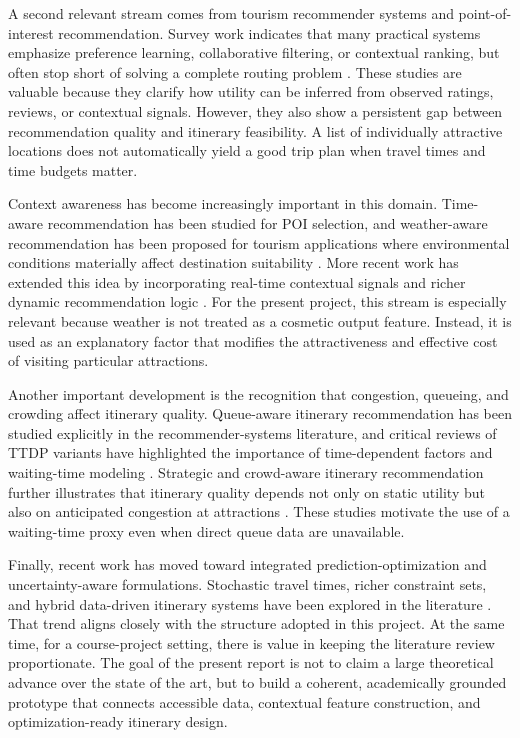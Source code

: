 \documentclass[12pt,a4paper]{article}
\begin{document}
A second relevant stream comes from tourism recommender systems and point-of-interest recommendation. Survey work indicates that many practical systems emphasize preference learning, collaborative filtering, or contextual ranking, but often stop short of solving a complete routing problem \citep{borras2014tourismsurvey, halder2024survey}. These studies are valuable because they clarify how utility can be inferred from observed ratings, reviews, or contextual signals. However, they also show a persistent gap between recommendation quality and itinerary feasibility. A list of individually attractive locations does not automatically yield a good trip plan when travel times and time budgets matter.

Context awareness has become increasingly important in this domain. Time-aware recommendation has been studied for POI selection, and weather-aware recommendation has been proposed for tourism applications where environmental conditions materially affect destination suitability \citep{yuan2013timeaware, braunhofer2013sts}. More recent work has extended this idea by incorporating real-time contextual signals and richer dynamic recommendation logic \citep{yoon2023realtime}. For the present project, this stream is especially relevant because weather is not treated as a cosmetic output feature. Instead, it is used as an explanatory factor that modifies the attractiveness and effective cost of visiting particular attractions.

Another important development is the recognition that congestion, queueing, and crowding affect itinerary quality. Queue-aware itinerary recommendation has been studied explicitly in the recommender-systems literature, and critical reviews of TTDP variants have highlighted the importance of time-dependent factors and waiting-time modeling \citep{lim2017queuing, porras2022critical}. Strategic and crowd-aware itinerary recommendation further illustrates that itinerary quality depends not only on static utility but also on anticipated congestion at attractions \citep{liu2021scair}. These studies motivate the use of a waiting-time proxy even when direct queue data are unavailable.

Finally, recent work has moved toward integrated prediction-optimization and uncertainty-aware formulations. Stochastic travel times, richer constraint sets, and hybrid data-driven itinerary systems have been explored in the literature \citep{vu2022branchcheck, ghobadi2023integrated, ding2024stochastic, kedkaew2024bev}. That trend aligns closely with the structure adopted in this project. At the same time, for a course-project setting, there is value in keeping the literature review proportionate. The goal of the present report is not to claim a large theoretical advance over the state of the art, but to build a coherent, academically grounded prototype that connects accessible data, contextual feature construction, and optimization-ready itinerary design.
\end{document}
